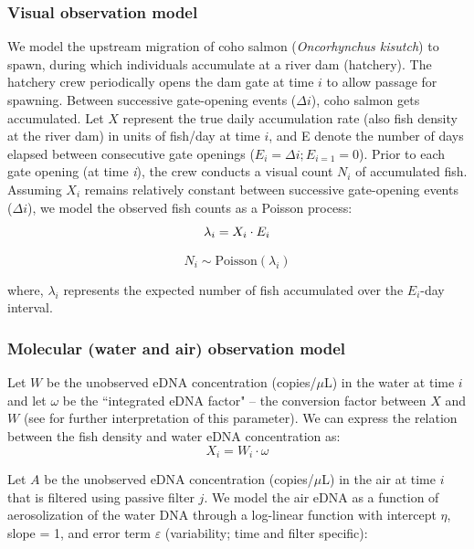 \documentclass{article}
\begin{document}
\subsubsection{Visual observation model}
We model the upstream migration of coho salmon (\textit{Oncorhynchus kisutch}) to spawn, during which individuals accumulate at a river dam (hatchery). The hatchery crew periodically opens the dam gate at time $i$ to allow passage for spawning. Between successive gate-opening events ($\Delta i$), coho salmon gets accumulated. Let $X$ represent the true daily accumulation rate (also fish density at the river dam) in units of fish/day at time $i$, and E denote the number of days elapsed between consecutive gate openings ($ E_i =\Delta i; E_{i=1} = 0$). Prior to each gate opening (at time \textit{i}), the crew conducts a visual count $N_i$ of accumulated fish.
Assuming $X_i$ remains relatively constant between successive gate-opening events ($\Delta i$), we model the observed fish counts as a Poisson process:
\begin{equation}
\lambda_i = X_i \cdot E_i \\
\end{equation}

\begin{equation}
N_i \sim \mathrm{Poisson}(\lambda_i)
\end{equation}

where, $\lambda_i$ represents the expected number of fish accumulated over the $E_i$-day interval.

\subsubsection{Molecular (water and air) observation model}
Let $W$ be the unobserved eDNA concentration (copies/$\mu$L) in the water at time $i$ and let $\omega$ be the ``integrated eDNA factor" -- the conversion factor between $X$ and $W$ (see \cite{guri2024a} for further interpretation of this parameter). We can express the relation between the fish density and water eDNA concentration as:
\begin{equation}
X_{i} = W_{i} \cdot \omega
\end{equation}

Let $A$ be the unobserved eDNA concentration (copies/$\mu$L) in the air at time $i$ that is filtered using passive filter $j$. We model the air eDNA as a function of aerosolization of the water DNA through a log-linear function with intercept $\eta$, slope = 1, and error term $\varepsilon$ (variability; time and filter specific):
\end{document}
